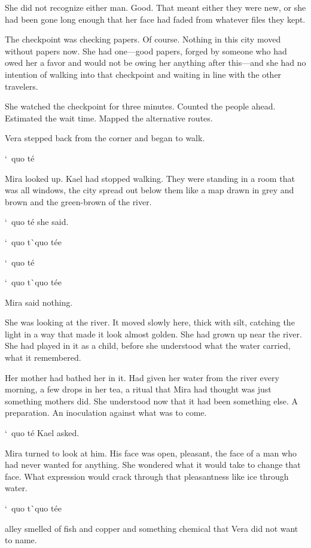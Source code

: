 \documentclass[12pt,letterpaper,openany]{book}
\begin{document}
\par
She did not recognize either man. Good. That meant either they were new, or she had been gone long enough that her face had faded from whatever files they kept.
\par
The checkpoint was checking papers. Of course. Nothing in this city moved without papers now. She had one—good papers, forged by someone who had owed her a favor and would not be owing her anything after this—and she had no intention of walking into that checkpoint and waiting in line with the other travelers.
\par
She watched the checkpoint for three minutes. Counted the people ahead. Estimated the wait time. Mapped the alternative routes.
\par
Vera stepped back from the corner and began to walk.
\par
\hrulefill`\ quo t\'e{}
\par
Mira looked up. Kael had stopped walking. They were standing in a room that was all windows, the city spread out below them like a map drawn in grey and brown and the green-brown of the river.
\par
`\ quo t\'e{} she said.
\par
`\ quo t\`\ quo t\'e{}e{}
\par
`\ quo t\'e{}
\par
`\ quo t\`\ quo t\'e{}e{}
\par
Mira said nothing.
\par
She was looking at the river. It moved slowly here, thick with silt, catching the light in a way that made it look almost golden. She had grown up near the river. She had played in it as a child, before she understood what the water carried, what it remembered.
\par
Her mother had bathed her in it. Had given her water from the river every morning, a few drops in her tea, a ritual that Mira had thought was just something mothers did. She understood now that it had been something else. A preparation. An inoculation against what was to come.
\par
`\ quo t\'e{} Kael asked.
\par
Mira turned to look at him. His face was open, pleasant, the face of a man who had never wanted for anything. She wondered what it would take to change that face. What expression would crack through that pleasantness like ice through water.
\par
`\ quo t\`\ quo t\'e{}e{}
\par
\hrulefillThe alley smelled of fish and copper and something chemical that Vera did not want to name.
\end{document}
